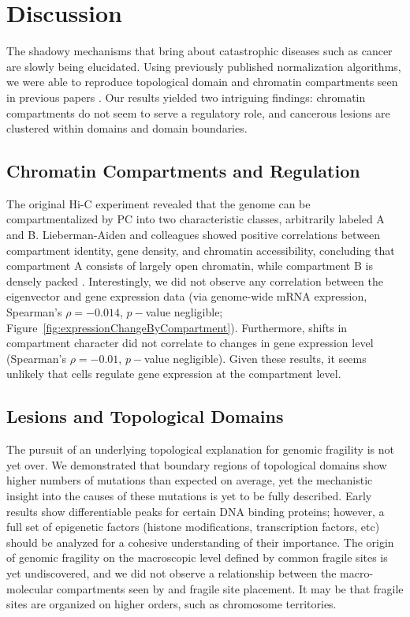 \chapter{Discussion}

The shadowy mechanisms that bring about catastrophic diseases such as cancer are slowly being elucidated.  Using previously published normalization
algorithms, we were able to reproduce topological domain and chromatin compartments seen in previous papers \citep{dekker2012, dixon2012}. Our results
yielded two intriguing findings: chromatin compartments do not seem to serve a regulatory role, and cancerous lesions are clustered within domains
and domain boundaries.

\section*{Chromatin Compartments and Regulation}

The original Hi-C experiment revealed that the genome can be compartmentalized by \gls{PC} into two characteristic classes, arbitrarily
labeled A and B.  Lieberman-Aiden and colleagues showed positive correlations between compartment identity, gene density, and chromatin
accessibility, concluding that compartment A consists of largely open chromatin, while compartment B is densely packed \citep{aiden2009}.
Interestingly, we did not observe any correlation between the eigenvector and gene expression data (via genome-wide mRNA expression,
Spearman's $\rho = -0.014$, $p-$value negligible; Figure~\ref{fig:expressionChangeByCompartment}).  Furthermore, shifts in compartment character did not correlate to
changes in gene expression level (Spearman's $\rho = -0.01$, $p-$value negligible).  Given these results, it seems unlikely that cells regulate
gene expression at the compartment level.

\section*{Lesions and Topological Domains}

The pursuit of an underlying topological explanation for genomic fragility is not yet over.  We demonstrated that boundary regions of topological
domains show higher numbers of mutations than expected on average, yet the mechanistic insight into the causes of these mutations is yet to be
fully described.  Early results show differentiable peaks for certain \gls{DNA} binding proteins; however, a full set of epigenetic factors (histone
modifications, transcription factors, etc) should be analyzed for a cohesive understanding of their importance.  The origin of genomic fragility on
the macroscopic level defined by common fragile sites is yet undiscovered, and we did not observe a relationship between the macro-molecular
compartments seen by \citet{dekker2012} and fragile site placement.  It may be that fragile sites are organized on higher orders, such as chromosome
territories.

